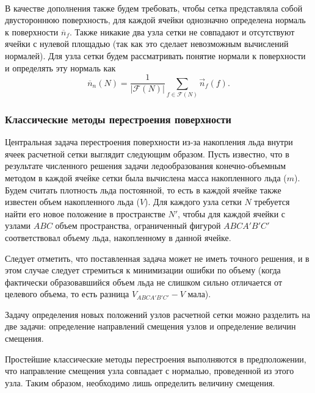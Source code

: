 \

В качестве дополнения также будем требовать, чтобы сетка представляла собой двустороннюю поверхность, для каждой ячейки однозначно определена нормаль к поверхности $\overline{n}_f$.
Также никакие два узла сетки не совпадают и отсутствуют ячейки с нулевой площадью (так как это сделает невозможным вычислений нормалей).
Для узла сетки будем рассматривать понятие нормали к поверхности и определять эту нормаль как
\begin{equation}
\overline{n}_n(N) = \frac{1}{|\mathscr{F}(N)|} \sum_{f \in \mathscr{F}(N)}{\vec{n}_f(f)}.
\end{equation}


\subsubsection{Классические методы перестроения поверхности}

Центральная задача перестроения поверхности из-за накопления льда внутри ячеек расчетной сетки выглядит следующим образом.
Пусть известно, что в результате численного решения задачи ледообразования конечно-объемным методом \cite{Beaugendre2003Ice} в каждой ячейке сетки была вычислена масса накопленного льда ($m$).
Будем считать плотность льда постоянной, то есть в каждой ячейке также известен объем накопленного льда ($V$).
Для каждого узла сетки $N$ требуется найти его новое положение в пространстве $N'$, чтобы для каждой ячейки с узлами $ABC$ объем пространства, ограниченный фигурой $ABCA'B'C'$ соответствовал объему льда, накопленному в данной ячейке.

Следует отметить, что поставленная задача может не иметь точного решения, и в этом случае следует стремиться к минимизации ошибки по объему (когда фактически образовавшийся объем льда не слишком сильно отличается от целевого объема, то есть разница $V_{ABCA'B'C'} - V$ мала).

Задачу определения новых положений узлов расчетной сетки можно разделить на две задачи: определение направлений смещения узлов и определение величин смещения.

Простейшие классические методы перестроения выполняются в предположении, что направление смещения узла совпадает с нормалью, проведенной из этого узла.
Таким образом, необходимо лишь определить величину смещения.

